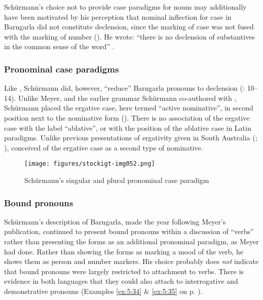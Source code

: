 Schürmann’s choice not to provide case paradigms for nouns may additionally have been motivated by his perception that nominal inflection for case in Barngarla did not constitute declension, since the marking of case was not fused with the marking of number (). He wrote: “there is no declension of substantives in the common sense of the word” \citep[4]{schurmann_vocabulary_1844}.

\subsubsection{Pronominal case paradigms}
\label{sec:key:6.2.1.2}

Like \citet{meyer_vocabulary_1843}, Schürmann did, however, “reduce” Barngarla pronouns to declension (\citealt{schurmann1840}: 10--14). Unlike Meyer, and the earlier grammar Schürmann co-authored with \citet{teichelmann_outlines_1840}, Schürmann placed the ergative case, here termed ``active nominative'', in second position next to the nominative form (). There is no association of the ergative case with the label ``ablative'', or with the position of the ablative case in Latin paradigms. Unlike previous presentations of ergativity given in South Australia (\citealt{teichelmann_outlines_1840}; \citealt{meyer_vocabulary_1843}), \citet{schurmann_letter_1844} conceived of the ergative case as a second type of nominative.


\begin{figure}
\texttt{[image: figures/stockigt-img052.png]}
\caption{Schürmann’s singular and plural pronominal case paradigm \citeyearpar[11]{schurmann_vocabulary_1844}}
\label{fig:key:108}
\end{figure}

\subsubsection{Bound pronouns}
\label{sec:key:6.2.1.3}\label{bkm:Ref73561555}\label{bkm:Ref73561601}

Schürmann’s description of Barngarla, made the year following Meyer’s publication, continued to present bound pronouns within a discussion of “verbs” rather than presenting the forms as an additional pronominal paradigm, as Meyer had done. Rather than showing the forms as marking a mood of the verb, he shows them as person and number markers. His choice probably does \textit{not} indicate that bound pronouns were largely restricted to attachment to verbs. There is evidence in both languages that they could also attach to interrogative and demonstrative pronouns (Examples \ref{ex:5:34} \& \ref{ex:5:35} on p. \pageref{ex:5:34}).


